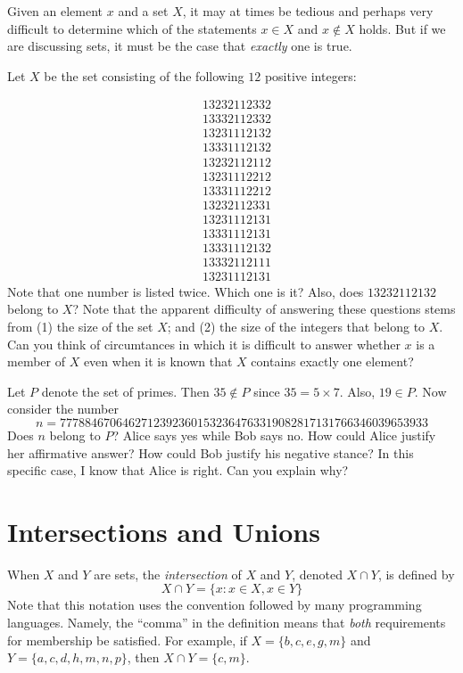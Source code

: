 Given an element $x$ and a set $X$, it may at times be tedious and
perhaps very difficult to determine which of the statements
$x\in X$ and $x\notin X$ holds.  But if we are discussing sets,
it must be the case that \textit{exactly} one is true.

\begin{example}
Let $X$ be the set consisting of the following $12$ positive
integers:

\begin{align*}
&13232112332\\
&13332112332\\
&13231112132\\
&13331112132\\
&13232112112\\
&13231112212\\
&13331112212\\
&13232112331\\
&13231112131\\
&13331112131\\
&13331112132\\
&13332112111\\
&13231112131
\end{align*}
Note that one number is listed twice.  Which one is it?
Also, does $13232112132$ belong to $X$?  Note that the
apparent difficulty of answering these questions stems from
(1) the size of the set $X$; and (2) the size of the integers 
that belong to $X$.  Can you think of circumtances in which
it is difficult to answer whether $x$ is a member of $X$
even when it is known that $X$ contains exactly one element?
\end{example}

\begin{example}
Let $P$ denote the set of primes.  Then $35\notin P$ since
$35= 5\times 7$.  Also, $19\in P$.  Now consider the number
\[
n = 77788467064627123923601532364763319082817131766346039653933
\]
Does $n$ belong to $P$?  Alice says yes while Bob says no.
How could Alice justify her affirmative answer?  How could Bob
justify his negative stance?  In this specific case, I know that
Alice is right.  Can you explain why?
\end{example}

\section{Intersections and Unions}

When $X$ and $Y$ are sets, the \textit{intersection}
of $X$ and $Y$, denoted $X\cap Y$, is defined by
\[
X\cap Y = \{x: x\in X, x\in Y\}
\]
Note that this notation uses the convention followed by
many programming languages. Namely, the ``comma'' in the
definition means that \textit{both} requirements for
membership be satisfied.  For example, if $X=\{b,c,e,g,m\}$
and $Y=\{a,c,d,h,m,n,p\}$, then $X\cap Y=\{c,m\}$.

